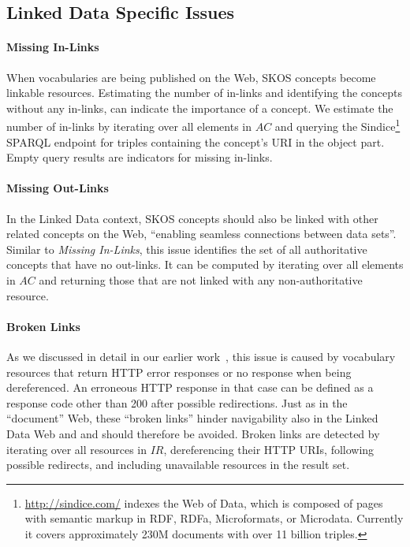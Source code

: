 {%

\subsection{Linked Data Specific Issues}\label{subsec:ld_issues}

\paragraph{Missing In-Links}

When vocabularies are being published on the Web, SKOS concepts become linkable resources. Estimating the number of in-links and identifying the concepts without any in-links, can indicate the importance of a concept.
We estimate the number of in-links by iterating over all elements in $AC$ and querying the Sindice\footnote{\url{http://sindice.com/} indexes the Web of Data, which is composed of pages with semantic markup in RDF, RDFa, Microformats, or Microdata. Currently it covers approximately 230M documents with over 11 billion triples.} SPARQL endpoint for triples containing the concept's URI in the object part. Empty query results are indicators for missing in-links.

\paragraph{Missing Out-Links}

In the Linked Data context, SKOS concepts should also be linked with other related concepts on the Web, ``enabling seamless connections between data sets''\cite{Heath2011}. Similar to \emph{Missing In-Links}, this issue identifies the set of all authoritative concepts that have no out-links.
It can be computed by iterating over all elements in $AC$ and returning those that are not linked with any non-authoritative resource.

\paragraph{Broken Links}

As we discussed in detail in our earlier work~\cite{Popitsch:2010:DHB:1772690.1772768}, this issue is caused by vocabulary resources that return HTTP error responses or no response when being dereferenced. An erroneous HTTP response in that case can be defined as a response code other than 200 after possible redirections. Just as in the ``document'' Web, these ``broken links'' hinder navigability also in the Linked Data Web and and should therefore be avoided. 
Broken links are detected by iterating over all resources in $IR$, dereferencing their HTTP URIs, following possible redirects, and including unavailable resources in the result set.

}
